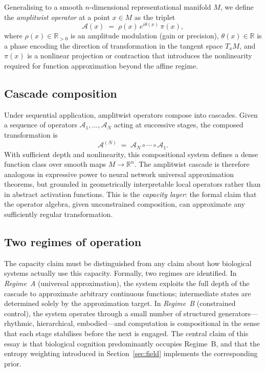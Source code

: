 \documentclass[12pt, a4paper]{article}
\theoremstyle{remark}
\theoremstyle{definition}
\newcommand{\A}{\mathcal{A}}
\begin{document}
Generalising to a smooth $n$-dimensional representational manifold $M$, we define the
\emph{amplitwist operator} at a point $x \in M$ as the triplet
\begin{equation}
  \A(x) \;=\; \rho(x)\, e^{i\theta(x)}\, \pi(x),
  \label{eq:operator}
\end{equation}
where $\rho(x) \in \mathbb{R}_{>0}$ is an amplitude modulation (gain or precision),
$\theta(x) \in \mathbb{R}$ is a phase encoding the direction of transformation in the
tangent space $T_x M$, and $\pi(x)$ is a nonlinear projection or contraction that
introduces the nonlinearity required for function approximation beyond the affine regime.

\subsection{Cascade composition}

Under sequential application, amplitwist operators compose into cascades.  Given a sequence
of operators $\A_1, \ldots, \A_N$ acting at successive stages, the composed transformation
is
\begin{equation}
  \A^{(N)} \;=\; \A_N \circ \cdots \circ \A_1.
  \label{eq:cascade}
\end{equation}
With sufficient depth and nonlinearity, this compositional system defines a dense function
class over smooth maps $M \to \mathbb{R}^n$.  The amplitwist cascade is therefore
analogous in expressive power to neural network universal approximation theorems, but
grounded in geometrically interpretable local operators rather than in abstract activation
functions.  This is the \emph{capacity layer}: the formal claim that the operator algebra,
given unconstrained composition, can approximate any sufficiently regular transformation.

\subsection{Two regimes of operation}

The capacity claim must be distinguished from any claim about how biological systems
actually use this capacity.  Formally, two regimes are identified.  In \emph{Regime~A}
(universal approximation), the system exploits the full depth of the cascade to approximate
arbitrary continuous functions; intermediate states are determined solely by the
approximation target.  In \emph{Regime~B} (constrained control), the system operates
through a small number of structured generators---rhythmic, hierarchical,
embodied---and computation is compositional in the sense that each stage stabilises before
the next is engaged.  The central claim of this essay is that biological cognition
predominantly occupies Regime~B, and that the entropy weighting introduced in
Section~\ref{sec:field} implements the corresponding prior.
\end{document}
